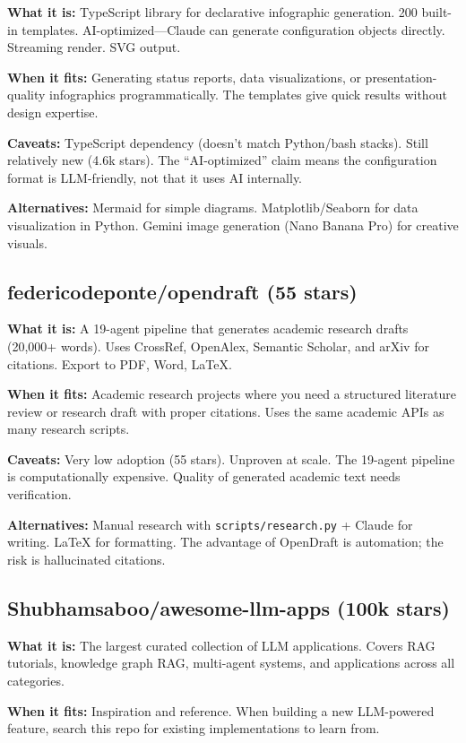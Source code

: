\documentclass[11pt,a4paper]{article}
\begin{document}
\textbf{What it is:} TypeScript library for declarative infographic generation. 200 built-in templates. AI-optimized---Claude can generate configuration objects directly. Streaming render. SVG output.

\textbf{When it fits:} Generating status reports, data visualizations, or presentation-quality infographics programmatically. The templates give quick results without design expertise.

\textbf{Caveats:} TypeScript dependency (doesn't match Python/bash stacks). Still relatively new (4.6k stars). The ``AI-optimized'' claim means the configuration format is LLM-friendly, not that it uses AI internally.

\textbf{Alternatives:} Mermaid for simple diagrams. Matplotlib/Seaborn for data visualization in Python. Gemini image generation (Nano Banana Pro) for creative visuals.

\subsection{federicodeponte/opendraft (55 stars)}

\textbf{What it is:} A 19-agent pipeline that generates academic research drafts (20,000+ words). Uses CrossRef, OpenAlex, Semantic Scholar, and arXiv for citations. Export to PDF, Word, LaTeX.

\textbf{When it fits:} Academic research projects where you need a structured literature review or research draft with proper citations. Uses the same academic APIs as many research scripts.

\textbf{Caveats:} Very low adoption (55 stars). Unproven at scale. The 19-agent pipeline is computationally expensive. Quality of generated academic text needs verification.

\textbf{Alternatives:} Manual research with \texttt{scripts/research.py} + Claude for writing. LaTeX for formatting. The advantage of OpenDraft is automation; the risk is hallucinated citations.

\subsection{Shubhamsaboo/awesome-llm-apps (100k stars)}

\textbf{What it is:} The largest curated collection of LLM applications. Covers RAG tutorials, knowledge graph RAG, multi-agent systems, and applications across all categories.

\textbf{When it fits:} Inspiration and reference. When building a new LLM-powered feature, search this repo for existing implementations to learn from.
\end{document}
